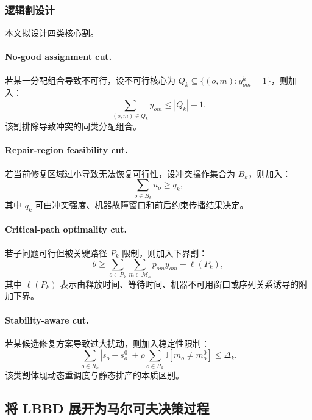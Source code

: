\documentclass[UTF8,12pt,a4paper]{ctexart}
\newcommand{\M}{\mathcal{M}}
\begin{document}
\subsubsection{逻辑割设计}

本文拟设计四类核心割。

\paragraph{No-good assignment cut.} 若某一分配组合导致不可行，设不可行核心为 $Q_k\subseteq\{(o,m):y^k_{om}=1\}$，则加入：
\begin{equation}
    \sum_{(o,m)\in Q_k} y_{om} \leq |Q_k|-1.
\end{equation}
该割排除导致冲突的同类分配组合。

\paragraph{Repair-region feasibility cut.} 若当前修复区域过小导致无法恢复可行性，设冲突操作集合为 $B_k$，则加入：
\begin{equation}
    \sum_{o\in B_k} u_o \geq q_k,
\end{equation}
其中 $q_k$ 可由冲突强度、机器故障窗口和前后约束传播结果决定。

\paragraph{Critical-path optimality cut.} 若子问题可行但被关键路径 $P_k$ 限制，则加入下界割：
\begin{equation}
    \theta \geq \sum_{o\in P_k}\sum_{m\in\M_o}p_{om}y_{om}+\ell(P_k),
\end{equation}
其中 $\ell(P_k)$ 表示由释放时间、等待时间、机器不可用窗口或序列关系诱导的附加下界。

\paragraph{Stability-aware cut.} 若某候选修复方案导致过大扰动，则加入稳定性限制：
\begin{equation}
    \sum_{o\in R_k}|s_o-s_o^0| + \rho\sum_{o\in R_k}\mathbb{I}[m_o\neq m_o^0] \leq \Delta_k.
\end{equation}
该类割体现动态重调度与静态排产的本质区别。

\subsection{将 LBBD 展开为马尔可夫决策过程}
\end{document}
